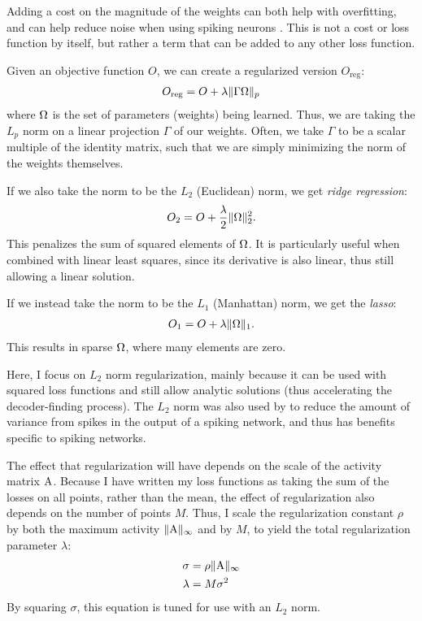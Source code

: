 Adding a cost on the magnitude of the weights
can both help with overfitting,
and can help reduce noise when using spiking neurons \parencite{Eliasmith2003}.
This is not a cost or loss function by itself,
but rather a term that can be added to any other loss function.

Given an objective function $O$,
we can create a regularized version $O_\text{reg}$:
\begin{align}
  O_\text{reg} = O + \lambda \|\Gamma \Omega\|_p
\end{align}
where $\Omega$ is the set of parameters (weights) being learned.
Thus, we are taking the $L_p$ norm on a linear projection $\Gamma$ of our weights.
Often, we take $\Gamma$ to be a scalar multiple of the identity matrix,
such that we are simply minimizing the norm of the weights themselves.

If we also take the norm to be the $L_2$ (Euclidean) norm,
we get \emph{ridge regression}:
\begin{align}
  O_2 = O + \frac{\lambda}{2} \|\Omega\|_2^2.
\end{align}
This penalizes the sum of squared elements of $\Omega$.
It is particularly useful when combined with linear least squares,
since its derivative is also linear, thus still allowing a linear solution.

If we instead take the norm to be the $L_1$ (Manhattan) norm,
we get the \emph{lasso}:
\begin{align}
  O_1 = O + \lambda \|\Omega\|_1.
\end{align}
This results in sparse $\Omega$, where many elements are zero.

Here, I focus on $L_2$ norm regularization,
mainly because it can be used with squared loss functions
and still allow analytic solutions
(thus accelerating the decoder-finding process).
The $L_2$ norm was also used by \textcite{Eliasmith2003}
to reduce the amount of variance from spikes in the output of a spiking network,
and thus has benefits specific to spiking networks.

The effect that regularization will have depends on
the scale of the activity matrix $\mathrm{A}$.
Because I have written my loss functions as taking
the sum of the losses on all points, rather than the mean,
the effect of regularization also depends on the number of points $M$.
Thus, I scale the regularization constant $\rho$
by both the maximum activity $\|\mathrm{A}\|_\infty$ and by $M$,
to yield the total regularization parameter $\lambda$:
\begin{align}
  \sigma &= \rho \|\mathrm{A}\|_\infty \\
  \lambda &= M \sigma^2
\end{align}
By squaring $\sigma$, this equation is tuned for use with an $L_2$ norm.

